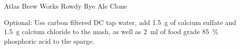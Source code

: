 \stylesection{\styleryeipa}

\begin{recipe}{Atlas Brew Works Rowdy Rye Ale Clone}

\begin{aboutblock}
\sourceaha
\end{aboutblock}


\begin{methodandtiming}
 
\begin{mashsteps}
\end{mashsteps}

\begin{directions}
Optional: Use carbon filtered DC tap water, add 1.5~g of calcium sulfate and
1.5~g calcium chloride to the mash, as well as 2~ml of food grade 85~\%
phosphoric acid to the sparge.
\end{directions}

\end{methodandtiming}

\recipebreak

\begin{ingredientsblock}

\begin{malts}
\end{malts}

\begin{hops}
\end{hops}


\end{ingredientsblock}

\end{recipe}


